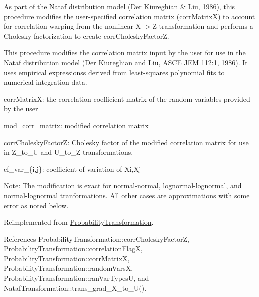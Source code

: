 As part of the Nataf distribution model (Der Kiureghian \& Liu, 1986), this procedure modifies the user-\/specified correlation matrix (corr\+MatrixX) to account for correlation warping from the nonlinear X-\/$>$Z transformation and performs a Cholesky factorization to create corr\+Cholesky\+FactorZ. 

This procedure modifies the correlation matrix input by the user for use in the Nataf distribution model (Der Kiureghian and Liu, A\+S\+CE J\+EM 112\+:1, 1986). It uses empirical expressionss derived from least-\/squares polynomial fits to numerical integration data.

\begin{DoxyItemize}
\item corr\+MatrixX\+: the correlation coefficient matrix of the random variables provided by the user\end{DoxyItemize}
\begin{DoxyItemize}
\item mod\+\_\+corr\+\_\+matrix\+: modified correlation matrix\end{DoxyItemize}
\begin{DoxyItemize}
\item corr\+Cholesky\+FactorZ\+: Cholesky factor of the modified correlation matrix for use in Z\+\_\+to\+\_\+U and U\+\_\+to\+\_\+Z transformations.\end{DoxyItemize}
\begin{DoxyItemize}
\item cf\+\_\+var\+\_\+\{i,j\}\+: coefficient of variation of Xi,Xj\end{DoxyItemize}
Note\+: The modification is exact for normal-\/normal, lognormal-\/lognormal, and normal-\/lognormal tranformations. All other cases are approximations with some error as noted below. 

Reimplemented from \hyperlink{classPecos_1_1ProbabilityTransformation_a1be77b7133acb8e63d2c6957b9eb6265}{Probability\+Transformation}.



References Probability\+Transformation\+::corr\+Cholesky\+FactorZ, Probability\+Transformation\+::correlation\+FlagX, Probability\+Transformation\+::corr\+MatrixX, Probability\+Transformation\+::random\+VarsX, Probability\+Transformation\+::ran\+Var\+TypesU, and Nataf\+Transformation\+::trans\+\_\+grad\+\_\+\+X\+\_\+to\+\_\+\+U().

